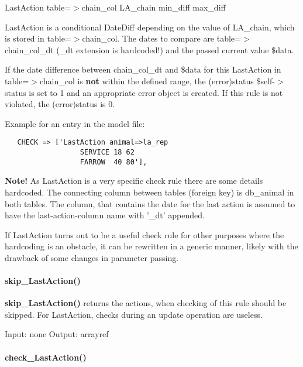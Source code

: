 LastAction table=$>$chain\_col LA\_chain min\_diff max\_diff



LastAction is a conditional DateDiff depending on the value of LA\_chain,
which is stored in table=$>$chain\_col. The dates to compare are
table=$>$chain\_col\_dt (\_dt extension is hardcoded!) and the passed current
value \$data.



If the date difference between chain\_col\_dt and \$data for this LastAction
in table=$>$chain\_col is \textbf{not} within the defined range, the (error)status
\$self-$>$status is set to 1 and an appropriate error object is created. If
this rule is not violated, the (error)status is 0.



Example for an entry in the model file:

\begin{verbatim}
   CHECK => ['LastAction animal=>la_rep
                  SERVICE 18 62
                  FARROW  40 80'],
\end{verbatim}


\textbf{Note!} As LastAction is a very specific check rule there are some details
hardcoded. The connecting column between tables (foreign key) is db\_animal
in both tables. The column, that contains the date for the last action is
assumed to have the last-action-column name with '\_dt' appended.



If LastAction turns out to be a useful check rule for other purposes where
the hardcoding is an obstacle, it can be rewritten in a generic manner,
likely with the drawback of some changes in parameter passing.

\paragraph*{skip\_LastAction()\label{skip_LastAction_}}


\textbf{skip\_LastAction()} returns the actions, when checking of this rule should be
skipped. For LastAction, checks during an update operation are useless.



Input: none
Output: arrayref

\paragraph*{check\_LastAction()\label{check_LastAction_}}


